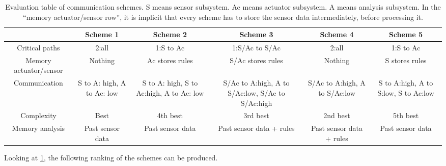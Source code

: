 \begin{table}[htbp]
\centering
\begin{adjustbox}{max width=\textwidth}
\begin{tabular}{*{6}{c}}
\toprule
                       & Scheme 1                                          & Scheme 2                                 & Scheme 3                                         & Scheme 4                      & Scheme 5                             \\ \midrule
Critical paths         & 2:all                                             & 1:S to Ac                                & 1:S/Ac to S/Ac                                   & 2:all                         & 1:S to Ac                            \\ \midrule
Memory actuator/sensor & Nothing                                           & Ac stores rules                          & S/Ac stores rules                                & Nothing                       & S stores rules                       \\ \midrule
Communication          & S to A: high, A to Ac: low                        & S to A: high, S to Ac:high, A to Ac: low & S/Ac to A:high, A to S/Ac:low, S/Ac to S/Ac:high & S/Ac to A:high, A to S/Ac:low & S to A:high, A to S:low, S to Ac:low \\ \midrule
Complexity             & Best                                              & 4th best                                 & 3rd best                                         & 2nd best                      & 5th best                             \\ \midrule
Memory analysis        & Past sensor data                                  & Past sensor data                         & Past sensor data + rules                         & Past sensor data + rules      & Past sensor data                     \\ \bottomrule
\end{tabular}
\end{adjustbox}
\caption[Evaluation table]{Evaluation table of communication schemes. S means sensor subsystem. Ac means actuator subsystem. A means analysis subsystem. In the \enquote{memory actuator/sensor row}, it is implicit that every scheme has to store the sensor data intermediately, before processing it.}\label{tab:scheme_choice}
\end{table}

Looking at \cref{tab:scheme_choice}, the following ranking of the schemes can be produced. 
